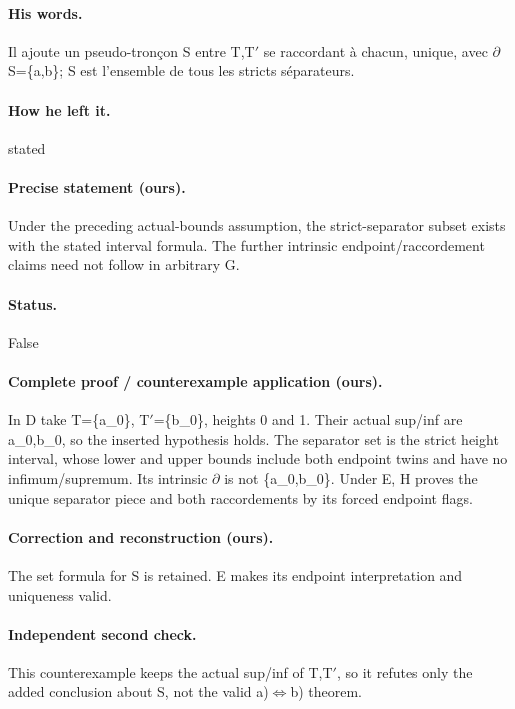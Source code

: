 \paragraph{His words.} Il ajoute un pseudo-tronçon S entre T,T\ensuremath{\prime} se raccordant à chacun, unique, avec \ensuremath{\partial}S=\{a,b\}; S est l’ensemble de tous les stricts séparateurs.

\paragraph{How he left it.} stated

\paragraph{Precise statement (ours).} Under the preceding actual-bounds assumption, the strict-separator subset exists with the stated interval formula. The further intrinsic endpoint/raccordement claims need not follow in arbitrary G.

\paragraph{Status.} False

\paragraph{Complete proof / counterexample application (ours).} In D take T=\{a\_0\}, T\ensuremath{\prime}=\{b\_0\}, heights 0 and 1. Their actual sup/inf are a\_0,b\_0, so the inserted hypothesis holds. The separator set is the strict height interval, whose lower and upper bounds include both endpoint twins and have no infimum/supremum. Its intrinsic \ensuremath{\partial} is not \{a\_0,b\_0\}. Under E, H proves the unique separator piece and both raccordements by its forced endpoint flags.

\paragraph{Correction and reconstruction (ours).} The set formula for S is retained. E makes its endpoint interpretation and uniqueness valid.

\paragraph{Independent second check.} This counterexample keeps the actual sup/inf of T,T\ensuremath{\prime}, so it refutes only the added conclusion about S, not the valid a)\ensuremath{\Longleftrightarrow}b) theorem.

